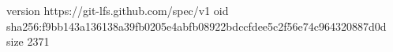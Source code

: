 version https://git-lfs.github.com/spec/v1
oid sha256:f9bb143a136138a39fb0205e4abfb08922bdccfdee5c2f56e74c964320887d0d
size 2371
